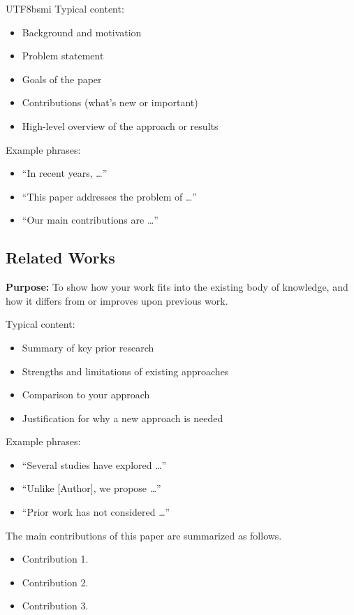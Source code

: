 \documentclass[conference]{IEEEtran}
\begin{document}
\begin{CJK}{UTF8}{bsmi}
Typical content:
\begin{itemize}
\item Background and motivation
\item Problem statement
\item Goals of the paper
\item Contributions (what’s new or important)
\item High-level overview of the approach or results
\end{itemize}

Example phrases:
\begin{itemize}
\item “In recent years, …”
\item “This paper addresses the problem of …”
\item “Our main contributions are …”
\end{itemize}



\subsection{Related Works}
{\bf Purpose:} To show how your work fits into the existing body of knowledge, and how it differs from or improves upon previous work.

Typical content:
\begin{itemize}
\item Summary of key prior research
\item Strengths and limitations of existing approaches
\item Comparison to your approach
\item Justification for why a new approach is needed
\end{itemize}

Example phrases:
\begin{itemize}
\item “Several studies have explored …”
\item “Unlike [Author], we propose …”
\item “Prior work has not considered …”
\end{itemize}



The main contributions of this paper are summarized as follows.
\begin{itemize}
\item Contribution 1.
\item Contribution 2. 
\item Contribution 3. 
\end{itemize}


\end{CJK}
\end{document}
